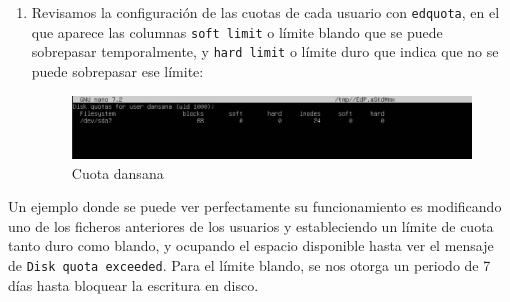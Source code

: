 \documentclass[10pt]{article}
\begin{document}
\begin{enumerate}
		\item Revisamos la configuración de las cuotas de cada usuario con \verb|edquota|, en el que aparece las columnas \verb|soft limit| o límite blando que se puede sobrepasar temporalmente, y \verb|hard limit| o límite duro que indica que no se puede sobrepasar ese límite:
		\begin{figure}[H]
			\setlength{\abovecaptionskip}{0cm}
			\setlength{\belowcaptionskip}{0cm}
			\centering
			\includegraphics[width=0.9\linewidth]{Recursos/quotaDansana.png}
			\caption{Cuota dansana}
		\end{figure}
	\end{enumerate}
	Un ejemplo donde se puede ver perfectamente su funcionamiento es modificando uno de los ficheros anteriores de los usuarios y estableciendo un límite de cuota tanto duro como blando, y ocupando el espacio disponible hasta ver el mensaje de \verb|Disk quota exceeded|. Para el límite blando, se nos otorga un periodo de 7 días hasta bloquear la escritura en disco.
	
\end{document}
